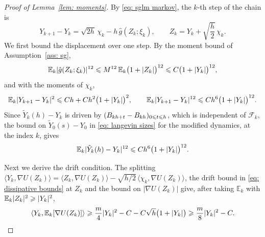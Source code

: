 \begin{proof}[Proof of Lemma~\ref{lem: moments}]
    By \eqref{eq: sglm markov}, the $k$-th step of the chain is
    \begin{equation*}
        Y_{k+1} - Y_k = \sqrt{2h}\, \chi_k - h\, \hat g(Z_k; \xi_k) , \qquad Z_k = Y_k + \sqrt{\frac h2}\, \chi_k .
    \end{equation*}
    We first bound the displacement over one step. By the moment bound of Assumption~\ref{ass: sg},
    \begin{equation*}
        \mathbb E_k |\hat g(Z_k; \xi_k)|^{12} \leqslant M^{12}\, \mathbb E_k \bigl( 1 + |Z_k| \bigr)^{12} \leqslant C \bigl( 1 + |Y_k| \bigr)^{12} ,
    \end{equation*}
    and with the moments of $\chi_k$,
    \begin{equation}
        \mathbb E_k |Y_{k+1} - Y_k|^{2} \leqslant C h + C h^{2} \bigl( 1 + |Y_k| \bigr)^{2} , \qquad
        \mathbb E_k |Y_{k+1} - Y_k|^{12} \leqslant C h^{6} \bigl( 1 + |Y_k| \bigr)^{12} .
        \label{eq: step displacement}
    \end{equation}
    Since $\tilde Y_k(h) - Y_k$ is driven by $(B_{kh+t} - B_{kh})_{0 \leqslant t \leqslant h}$, which is independent of $\mathcal F_k$, the bound on $\tilde Y_0(s) - Y_0$ in \eqref{eq: langevin sizes} for the modified dynamics, at the index $k$, gives
    \begin{equation}
        \mathbb E_k |\tilde Y_k(h) - Y_k|^{12} \leqslant C h^{6} \bigl( 1 + |Y_k| \bigr)^{12} .
        \label{eq: exact displacement}
    \end{equation}

    Next we derive the drift condition. The splitting $\langle Y_k, \nabla U(Z_k)\rangle = \langle Z_k, \nabla U(Z_k)\rangle - \sqrt{h/2}\, \langle \chi_k, \nabla U(Z_k)\rangle$, the drift bound in \eqref{eq: dissipative bounds} at $Z_k$ and the bound on $|\nabla U(Z_k)|$ give, after taking $\mathbb E_k$ with $\mathbb E_k |Z_k|^2 \geqslant |Y_k|^2$,
    \begin{equation}
        \langle Y_k, \mathbb E_k [\nabla U(Z_k)] \rangle \geqslant \frac m4 |Y_k|^2 - C - C \sqrt h \bigl( 1 + |Y_k| \bigr) \geqslant \frac{m}{8} |Y_k|^2 - C .
        \label{eq: drift condition}
    \end{equation}


\end{proof}
